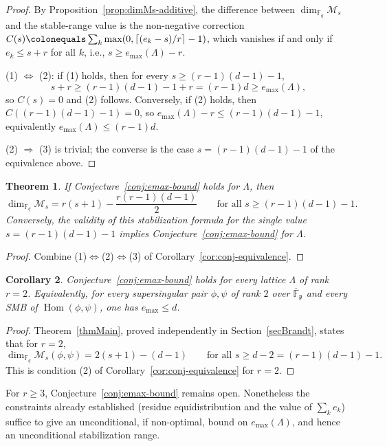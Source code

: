 \documentclass[12pt]{amsart}
\newtheorem{thm}{Theorem}[section]
\newtheorem{cor}[thm]{Corollary}
\theoremstyle{definition}
\theoremstyle{remark}
\numberwithin{equation}{section}
\numberwithin{thm}{section}
\DeclareMathOperator{\Hom}{Hom}
\newcommand{\fp}{\mathfrak{p}}
\newcommand{\cM}{\mathcal{M}}
\newcommand{\F}{\mathbb{F}}
\newcommand{\oF}{\overline{\F}}
\newcommand{\La}{\Lambda}
\begin{document}
	\begin{proof}
		By Proposition~\ref{prop:dimMs-additive}, the difference between $\dim_{\F_q}\cM_s$ and the stable-range value is the non-negative correction $C(s) \colonequals \sum_k\max(0, \lceil(e_k-s)/r\rceil - 1)$, which vanishes if and only if $e_k \leq s + r$ for all $k$, i.e., $s \geq e_{\max}(\La) - r$.
		
		(1) $\Leftrightarrow$ (2): if (1) holds, then for every $s \geq (r-1)(d-1) - 1$,
		\[
		s + r \geq (r-1)(d-1) - 1 + r = (r-1)d \geq e_{\max}(\La),
		\]
		so $C(s) = 0$ and (2) follows. Conversely, if (2) holds, then $C((r-1)(d-1) - 1) = 0$, so $e_{\max}(\La) - r \leq (r-1)(d-1) - 1$, equivalently $e_{\max}(\La) \leq (r-1)d$.
		
		(2) $\Rightarrow$ (3) is trivial; the converse is the case $s = (r-1)(d-1) - 1$ of the equivalence above.
	\end{proof}
	
	\begin{thm}\label{thm:main-stabilization}
		If Conjecture~\ref{conj:emax-bound} holds for $\La$, then
		\[
		\dim_{\F_q}\cM_s = r(s+1) - \frac{r(r-1)(d-1)}{2} \qquad \text{for all } s \geq (r-1)(d-1) - 1.
		\]
		Conversely, the validity of this stabilization formula for the single value $s = (r-1)(d-1) - 1$ implies Conjecture~\ref{conj:emax-bound} for $\La$.
	\end{thm}
	
	\begin{proof}
		Combine (1)$\Leftrightarrow$(2)$\Leftrightarrow$(3) of Corollary~\ref{cor:conj-equivalence}.
	\end{proof}
	
	\begin{cor}\label{cor:emax-r2}
		Conjecture~\ref{conj:emax-bound} holds for every lattice $\La$ of rank $r = 2$. Equivalently, for every supersingular pair $\phi, \psi$ of rank $2$ over $\oF_\fp$ and every SMB of $\Hom(\phi,\psi)$, one has $e_{\max} \leq d$.
	\end{cor}
	
	\begin{proof}
		Theorem~\ref{thmMain}, proved independently in Section~\ref{secBrandt}, states that for $r = 2$,
		\[
		\dim_{\F_q}\cM_s(\phi,\psi) = 2(s+1) - (d-1) \qquad \text{for all } s \geq d - 2 = (r-1)(d-1) - 1.
		\]
		This is condition (2) of Corollary~\ref{cor:conj-equivalence} for $r = 2$.
	\end{proof}
	
	For $r \geq 3$, Conjecture~\ref{conj:emax-bound} remains open. Nonetheless the constraints already established (residue equidistribution and the value of $\sum_k e_k$) suffice to give an unconditional, if non-optimal, bound on $e_{\max}(\La)$, and hence an unconditional stabilization range.
	
\end{document}
